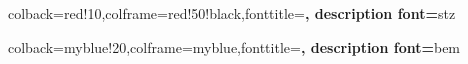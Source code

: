 \usepackage[toc,page]{appendix}  %

\usepackage{siunitx}      %

\usepackage{tcolorbox}

%
{colback=red!10,colframe=red!50!black,fonttitle=\bfseries,
description font=\mdseries\itshape}{stz}



%
{colback=myblue!20,colframe=myblue,fonttitle=\bfseries,
description font=\mdseries\itshape}{bem}


\usepackage[german]{babel}

\usepackage{titling}
\newcommand{\horrule}[1]{\rule{\linewidth}{#1}} 

\usepackage{parskip}